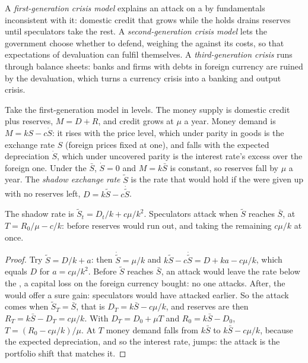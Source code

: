 \begin{definition}\label{def:b3:exchange-rate-regimes:crisis-models}
A \emph{first-generation crisis model} explains an attack on a  by fundamentals
inconsistent with it: domestic credit that grows while the  holds drains
reserves until speculators take the rest. A \emph{second-generation crisis model}
lets the government choose whether to defend, weighing the  against its costs,
so that expectations of devaluation can fulfil themselves. A \emph{third-generation
crisis} runs through balance sheets: banks and firms with debts in foreign currency
are ruined by the devaluation, which turns a currency crisis into a banking and
output crisis.
\end{definition}

Take the first-generation model in levels. The money supply is domestic credit
plus reserves, $M = D + R$, and credit grows at $\mu$ a year. Money demand is $M = kS -
c\dot S$: it rises with the price level, which under parity in goods is the exchange
rate $S$ (foreign prices fixed at one), and falls with the expected depreciation $\dot S$,
which under uncovered parity is the interest rate's excess over the foreign one.
Under the  $\bar S$, $\dot S = 0$ and $M = k\bar S$ is constant, so reserves fall by $\mu$ a year. The
\emph{shadow exchange rate} $\tilde S$ is the rate that would hold if the  were given up
with no reserves left, $D = k\tilde S - c\dot{\tilde S}$.

\begin{proposition}\label{prop:b3:exchange-rate-regimes:attack}
The shadow rate is $\tilde S_t = D_t/k + c\mu/k^2$. Speculators attack when $\tilde S$ reaches $\bar S$, at
$T = R_0/\mu - c/k$: before reserves would run out, and taking the remaining $c\mu/k$ at
once.
\end{proposition}

\begin{proof}
Try $\tilde S = D/k + a$: then $\dot{\tilde S} = \mu/k$ and $k\tilde S - c\dot{\tilde S} = D + ka - c\mu/k$, which equals
$D$ for $a = c\mu/k^2$. Before $\tilde S$ reaches $\bar S$, an attack would leave the rate below the
, a capital loss on the foreign currency bought: no one attacks. After, the
 would offer a sure gain: speculators would have attacked earlier. So the
attack comes when $\tilde S_T = \bar S$, that is $D_T = k\bar S - c\mu/k$, and reserves are then $R_T = k\bar S -
D_T = c\mu/k$. With $D_T = D_0 + \mu T$ and $R_0 = k\bar S - D_0$, $T = (R_0 - c\mu/k)/\mu$. At $T$ money demand falls
from $k\bar S$ to $k\bar S - c\mu/k$, because the expected depreciation, and so the interest rate,
jumps: the attack is the portfolio shift that matches it.
\end{proof}

